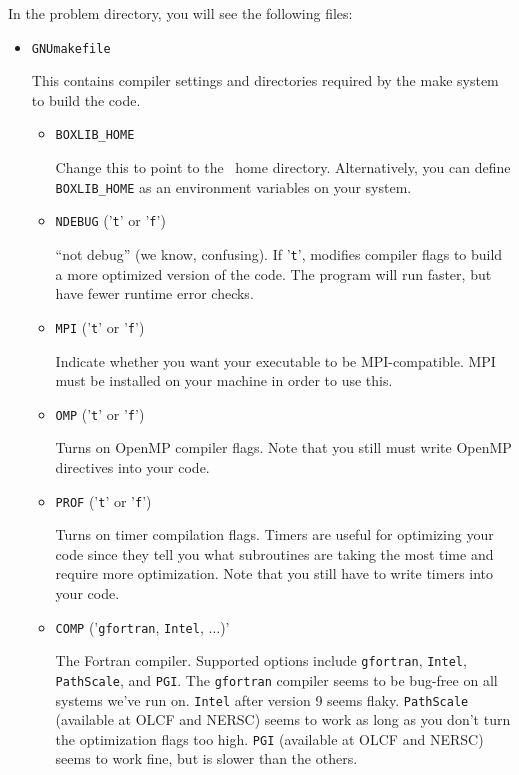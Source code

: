 In the problem directory, you will see the following files:
\begin{itemize}
\item {\tt GNUmakefile}

This contains compiler settings and directories required by the make system to build the code.

  \begin{itemize}

    \item {\tt BOXLIB\_HOME}

    Change this to point to the \BoxLib\ home directory.  Alternatively, you can define {\tt BOXLIB\_HOME}
    as an environment variables on your system.

    \item {\tt NDEBUG} ('{\tt t}' or '{\tt f}')
      
    ``not debug'' (we know, confusing).  If '{\tt t}', modifies compiler flags to build a 
    more optimized version of the code.  The program will run faster, but have fewer 
    runtime error checks.

    \item {\tt MPI} ('{\tt t}' or '{\tt f}')

    Indicate whether you want your executable to be MPI-compatible.  MPI must be installed on your
    machine in order to use this.

    \item {\tt OMP} ('{\tt t}' or '{\tt f}')

    Turns on OpenMP compiler flags.  Note that you still must write OpenMP directives into your code.

    \item {\tt PROF} ('{\tt t}' or '{\tt f}')

    Turns on timer compilation flags.  Timers are useful for optimizing your code since they tell you 
    what subroutines are taking the most time and require more optimization.  Note that you still have 
    to write timers into your code.

    \item {\tt COMP} ('{\tt gfortran}, {\tt Intel}, $\ldots$)'

    The Fortran compiler.  Supported options include {\tt gfortran}, {\tt Intel}, {\tt PathScale}, and 
    {\tt PGI}.  The {\tt gfortran} compiler seems to 
    be bug-free on all systems we've run on.  {\tt Intel} after version 9 seems flaky.  {\tt PathScale} 
    (available at OLCF and NERSC) seems to work as long as you don't turn the optimization flags too high.
    {\tt PGI} (available at OLCF and NERSC) seems to work fine, but is slower than the others.


\end{itemize}
\end{itemize}
